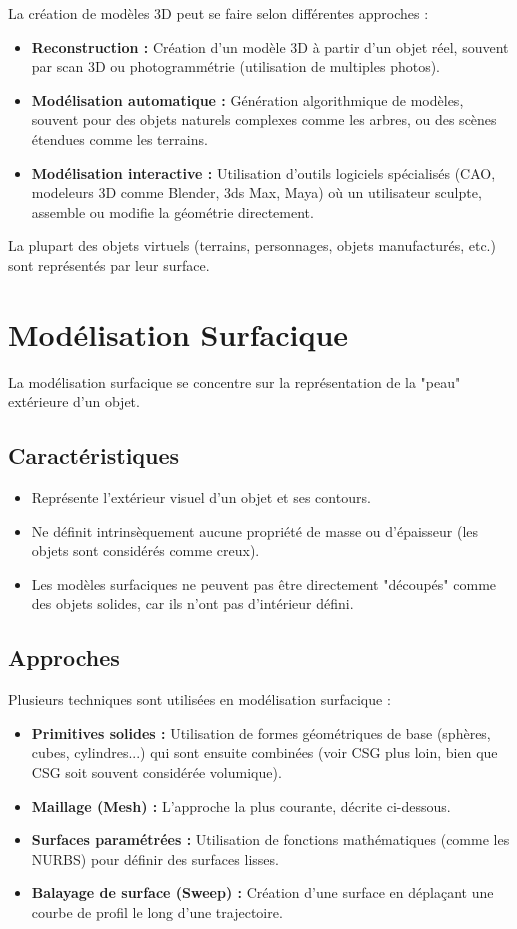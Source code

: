 \documentclass{article}
\begin{document}
La création de modèles 3D peut se faire selon différentes approches :

\begin{itemize}
    \item \textbf{Reconstruction :} Création d'un modèle 3D à partir d'un objet réel, souvent par scan 3D ou photogrammétrie (utilisation de multiples photos).
    \item \textbf{Modélisation automatique :} Génération algorithmique de modèles, souvent pour des objets naturels complexes comme les arbres, ou des scènes étendues comme les terrains.
    \item \textbf{Modélisation interactive :} Utilisation d'outils logiciels spécialisés (CAO, modeleurs 3D comme Blender, 3ds Max, Maya) où un utilisateur sculpte, assemble ou modifie la géométrie directement.
\end{itemize}
La plupart des objets virtuels (terrains, personnages, objets manufacturés, etc.) sont représentés par leur surface.

\section{Modélisation Surfacique}

La modélisation surfacique se concentre sur la représentation de la "peau" extérieure d'un objet.

\subsection{Caractéristiques}
\begin{itemize}
    \item Représente l'extérieur visuel d'un objet et ses contours.
    \item Ne définit intrinsèquement aucune propriété de masse ou d'épaisseur (les objets sont considérés comme creux).
    \item Les modèles surfaciques ne peuvent pas être directement "découpés" comme des objets solides, car ils n'ont pas d'intérieur défini.
\end{itemize}

\subsection{Approches}
Plusieurs techniques sont utilisées en modélisation surfacique :
\begin{itemize}
    \item \textbf{Primitives solides :} Utilisation de formes géométriques de base (sphères, cubes, cylindres...) qui sont ensuite combinées (voir CSG plus loin, bien que CSG soit souvent considérée volumique).
    \item \textbf{Maillage (Mesh) :} L'approche la plus courante, décrite ci-dessous.
    \item \textbf{Surfaces paramétrées :} Utilisation de fonctions mathématiques (comme les NURBS) pour définir des surfaces lisses.
    \item \textbf{Balayage de surface (Sweep) :} Création d'une surface en déplaçant une courbe de profil le long d'une trajectoire.
\end{itemize}
\end{document}

